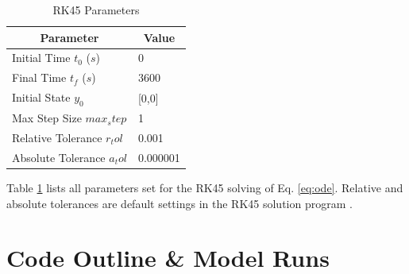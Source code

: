 \documentclass[12pt]{report}
\begin{document}
\begin{table}
\caption{RK45 Parameters}
\label{table:rk45}
\centering
\renewcommand{\arraystretch}{1.25}
\begin{tabular}{l l} %
\hline\hline
\multicolumn{1}{c}{Parameter} &
\multicolumn{1}{c}{Value} \\ %
\hline
Initial Time $t_0$ ($s$) & 0 \\
Final Time $t_f$ ($s$) & 3600 \\
Initial State $y_0$ & [0,0] \\
Max Step Size $max_step$ & 1 \\
Relative Tolerance $r_tol$ & 0.001 \\
Absolute Tolerance $a_tol$ & 0.000001 \\
\hline\hline
\end{tabular}
\normalsize
\end{table}

Table \ref{table:rk45} lists all parameters set for the RK45 solving of Eq. \ref{eq:ode}. Relative and absolute tolerances
are default settings in the RK45 solution program \cite{scipy}.

\section{Code Outline \& Model Runs }
\end{document}
